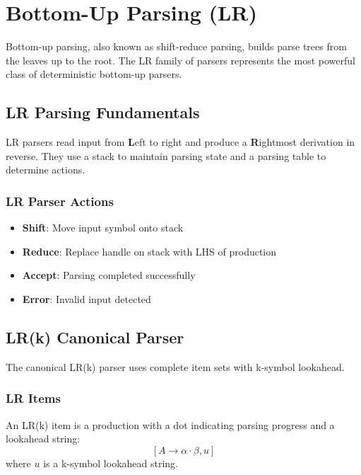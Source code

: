 

\section{Bottom-Up Parsing (LR)}
Bottom-up parsing, also known as shift-reduce parsing, builds parse trees from the leaves up to the root. The LR family of parsers represents the most powerful class of deterministic bottom-up parsers.

\subsection{LR Parsing Fundamentals}

LR parsers read input from \textbf{L}eft to right and produce a \textbf{R}ightmost derivation in reverse. They use a stack to maintain parsing state and a parsing table to determine actions.

\subsubsection{LR Parser Actions}
\begin{itemize}
    \item \textbf{Shift}: Move input symbol onto stack
    \item \textbf{Reduce}: Replace handle on stack with LHS of production
    \item \textbf{Accept}: Parsing completed successfully
    \item \textbf{Error}: Invalid input detected
\end{itemize}

\subsection{LR(k) Canonical Parser}

The canonical LR(k) parser uses complete item sets with k-symbol lookahead.

\subsubsection{LR Items}
An LR(k) item is a production with a dot indicating parsing progress and a lookahead string:
$$[A \to \alpha \cdot \beta, u]$$
where $u$ is a k-symbol lookahead string.


